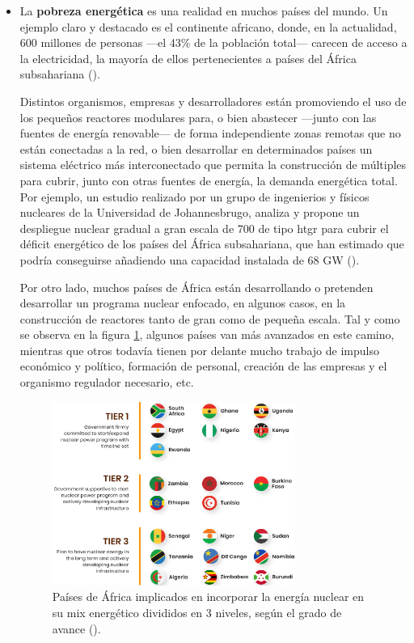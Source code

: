 \begin{itemize}
  \item La \textbf{pobreza energética} es una realidad en muchos países del mundo. Un ejemplo claro y destacado es el continente africano, donde, en la actualidad, 600 millones de personas ---el 43\% de la población total--- carecen de acceso a la electricidad, la mayoría de ellos pertenecientes a países del África subsahariana (\cite{iea_africa}). 
  
  Distintos organismos, empresas y desarrolladores están promoviendo el uso de los pequeños reactores modulares para, o bien abastecer ---junto con las fuentes de energía renovable--- de forma independiente zonas remotas que no están conectadas a la red, o bien desarrollar en determinados países un sistema eléctrico más interconectado que permita la construcción de múltiples  para cubrir, junto con otras fuentes de energía, la demanda energética total. Por ejemplo, un estudio realizado por un grupo de ingenierios y físicos nucleares de la Universidad de Johannesbrugo, analiza y propone un despliegue nuclear gradual a gran escala de 700  de tipo \acrshort{htgr} para cubrir el déficit energético de los países del África subsahariana, que han estimado que podría conseguirse añadiendo una capacidad instalada de 68 GW  (\cite{application_smrs_africa}). 
  
  Por otro lado, muchos países de África están desarrollando o pretenden desarrollar un programa nuclear enfocado, en algunos casos, en la construcción de reactores tanto de gran como de pequeña escala. Tal y como se observa en la figura \ref{fig:africa_nuclear_support}, algunos países van más avanzados en este camino, mientras que otros todavía tienen por delante mucho trabajo de impulso económico y político, formación de personal, creación de las empresas y el organismo regulador necesario, etc.

  \begin{figure}[h]
    \centering
    \includegraphics[width=0.75\textwidth]{content/figures/africa_nuclear_support.png}
    \caption{Países de África implicados en incorporar la energía nuclear en su mix energético divididos en 3 niveles, según el grado de avance (\cite{nba_africa}).}
    \label{fig:africa_nuclear_support}
  \end{figure}


\end{itemize}
